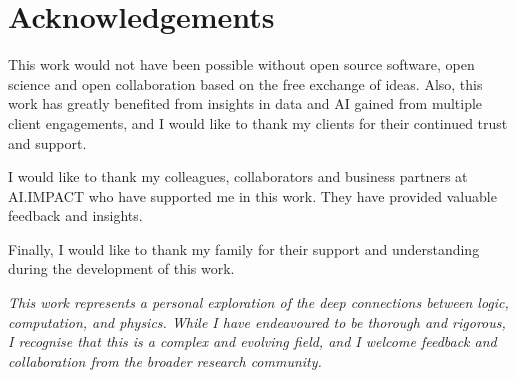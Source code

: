 \section*{Acknowledgements}

This work would not have been possible without open source software, open science and open collaboration based on the free exchange of ideas. Also, this work has greatly benefited from insights in data and AI gained from multiple client engagements, and I would like to thank my clients for their continued trust and support.

I would like to thank my colleagues, collaborators and business partners at AI.IMPACT who have supported me in this work. They have provided valuable feedback and insights.

Finally, I would like to thank my family for their support and understanding during the development of this work. 

\vspace{1em}

\textit{This work represents a personal exploration of the deep connections between logic, computation, and physics. While I have endeavoured to be thorough and rigorous, I recognise that this is a complex and evolving field, and I welcome feedback and collaboration from the broader research community.}
